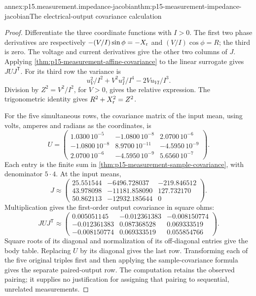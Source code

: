 \begin{annexitem}{annex:p15.measurement.impedance-jacobian}{thm:p15-measurement-impedance-jacobian}{The electrical-output covariance calculation}
\begin{proof}
Differentiate the three coordinate functions with \(I>0\).
The first two phase derivatives are respectively
\(-(V/I)\sin\phi=-X_{\rm r}\) and
\((V/I)\cos\phi=R\); the third is zero.
The voltage and current derivatives give the other two columns of \(J\).
Applying \cref{thm:p15-measurement-affine-covariance} to the linear
surrogate gives \(JUJ^{\mathsf T}\).
For its third row the variance is
\[
 u_V^2/I^2+V^2u_I^2/I^4-2Vu_{VI}/I^3.
\]
Division by \(Z^2=V^2/I^2\), for \(V>0\), gives the relative expression.
The trigonometric identity gives \(R^2+X_{\rm r}^2=Z^2\).

For the five simultaneous rows, the covariance matrix of the input mean,
using volts, amperes and radians as the coordinates, is
\[
 U=\begin{pmatrix}
 1.0300\,10^{-5}&-1.0800\,10^{-8}&2.0700\,10^{-6}\\
 -1.0800\,10^{-8}&8.9700\,10^{-11}&-4.5950\,10^{-9}\\
 2.0700\,10^{-6}&-4.5950\,10^{-9}&5.6560\,10^{-7}
 \end{pmatrix}.
\]
Each entry is the finite sum in
\cref{thm:p15-measurement-sample-covariance}, with denominator \(5\cdot4\).
At the input means,
\[
 J\approx\begin{pmatrix}
 25.551544&-6496.728037&-219.846512\\
 43.978098&-11181.858090&127.732170\\
 50.862113&-12932.185644&0
 \end{pmatrix}.
\]
Multiplication gives the first-order output covariance in square ohms:
\[
 JUJ^{\mathsf T}\approx
 \begin{pmatrix}
 0.005051145&-0.012361383&-0.008150774\\
 -0.012361383&0.087368528&0.069333519\\
 -0.008150774&0.069333519&0.055854766
 \end{pmatrix}.
\]
Square roots of its diagonal and normalization of its off-diagonal entries
give the body table. Replacing \(U\) by its diagonal gives the last row.
Transforming each of the five original triples first and then applying
the sample-covariance formula gives the separate paired-output row.
The computation retains the observed pairing; it supplies no justification
for assigning that pairing to sequential, unrelated measurements.
\end{proof}
\end{annexitem}

